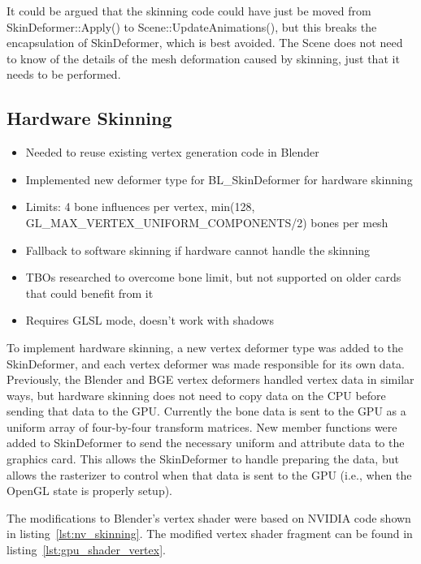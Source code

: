 It could be argued that the skinning code could have just be moved from SkinDeformer::Apply() to Scene::UpdateAnimations(), but this breaks the encapsulation of SkinDeformer, which is best avoided.
The Scene does not need to know of the details of the mesh deformation caused by skinning, just that it needs to be performed.

\subsection{Hardware Skinning}
\ifsummaries
\begin{itemize}
 \item Needed to reuse existing vertex generation code in Blender
 \item Implemented new deformer type for BL\_SkinDeformer for hardware skinning
 \item Limits: 4 bone influences per vertex, min(128, GL\_MAX\_VERTEX\_UNIFORM\_COMPONENTS/2) bones per mesh
 \item Fallback to software skinning if hardware cannot handle the skinning
 \item TBOs researched to overcome bone limit, but not supported on older cards that could benefit from it
 \item Requires GLSL mode, doesn't work with shadows
\end{itemize}
\fi

\label{sec:hardware_skinning}

To implement hardware skinning, a new vertex deformer type was added to the SkinDeformer, and each vertex deformer was made responsible for its own data.
Previously, the Blender and BGE vertex deformers handled vertex data in similar ways, but hardware skinning does not need to copy data on the CPU before sending that data to the GPU.
Currently the bone data is sent to the GPU as a uniform array of four-by-four transform matrices.
New member functions were added to SkinDeformer to send the necessary uniform and attribute data to the graphics card.
This allows the SkinDeformer to handle preparing the data, but allows the rasterizer to control when that data is sent to the GPU (i.e., when the OpenGL state is properly setup).

The modifications to Blender's vertex shader were based on NVIDIA code shown in listing~\ref{lst:nv_skinning}.
The modified vertex shader fragment can be found in listing~\ref{lst:gpu_shader_vertex}.



